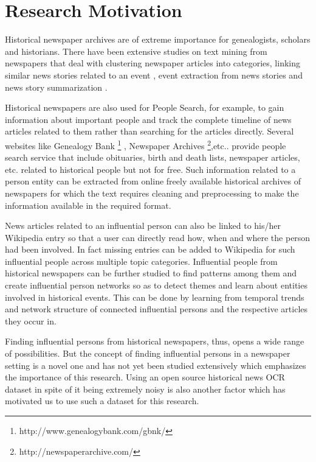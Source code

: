 


\section {Research Motivation}

Historical newspaper archives are of extreme importance for genealogists, scholars and historians. 
There have been extensive studies on text mining from newspapers that deal with clustering newspaper articles into categories\cite{dutta2011learning}, linking similar news stories related to an event \cite{khurdiya2011multi}\cite{shahaf2010connecting}, event extraction from news stories and news story summarization \cite{mckeown2002tracking}.


Historical newspapers are also used for People Search, for example, to gain information about important people and track the complete timeline of news articles related to them rather than searching for the articles directly. Several websites like Genealogy Bank \footnote{http://www.genealogybank.com/gbnk/} , Newspaper Archives \footnote{http://newspaperarchive.com/},etc.. provide people search service that include obituaries, birth and death lists, newspaper articles, etc. related to historical people but not for free. Such information related to a person entity can be extracted from online freely available historical archives of newspapers for which the text requires cleaning and preprocessing to make the information available in the required format.
  
News articles related to an influential person can also be linked to his/her Wikipedia entry so that a user can directly read how, when and where the person had been involved. In fact missing entries can be added to Wikipedia for such influential people across multiple topic categories.
Influential people from historical newspapers can be further studied to find patterns among them and create influential person networks so as to detect themes and learn about entities involved in historical events. This can be done by learning from temporal trends and network structure of connected influential persons and the respective articles they occur in. 


Finding influential persons from historical newspapers, thus,  opens a wide range of possibilities. But the concept of finding influential persons in a newspaper setting is a novel one and has not yet been studied extensively which emphasizes the importance of this research. Using an open source historical news OCR dataset in spite of it being extremely noisy is also another factor which has motivated us to use such a dataset for this research.


